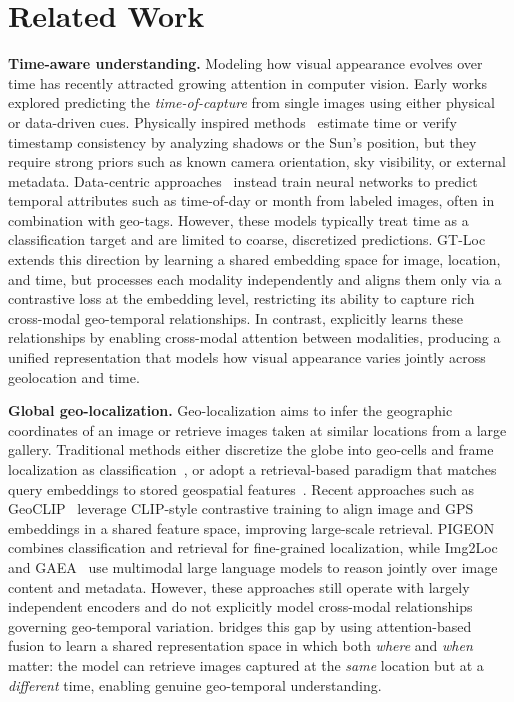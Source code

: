 \section{Related Work}
\label{sec:rel}

\textbf{Time-aware understanding.}
Modeling how visual appearance evolves over time has recently attracted growing attention in computer vision.
Early works explored predicting the \textit{time-of-capture} from single images using either physical or data-driven cues.
Physically inspired methods~\citep{tsai2016photo, li2017you} estimate time or verify timestamp consistency by analyzing shadows or the Sun’s position, but they require strong priors such as known camera orientation, sky visibility, or external metadata.
Data-centric approaches~\citep{zhai2019learning, salem2022timestamp, padilha2022content} instead train neural networks to predict temporal attributes such as time-of-day or month from labeled images, often in combination with geo-tags.
However, these models typically treat time as a classification target and are limited to coarse, discretized predictions.
GT-Loc~\citep{Shatwell_2025_ICCV} extends this direction by learning a shared embedding space for image, location, and time, but processes each modality independently and aligns them only via a contrastive loss at the embedding level, restricting its ability to capture rich cross-modal geo-temporal relationships.
In contrast, \tiger explicitly learns these relationships by enabling cross-modal attention between modalities, producing a unified representation that models how visual appearance varies jointly across geolocation and time.

\textbf{Global geo-localization.}
Geo-localization aims to infer the geographic coordinates of an image or retrieve images taken at similar locations from a large gallery.
Traditional methods either discretize the globe into geo-cells and frame localization as classification~\citep{weyand2016planet, vo2017revisiting, muller2018geolocation, pramanick2022world, kulkarni2024cityguessr}, or adopt a retrieval-based paradigm that matches query embeddings to stored geospatial features~\citep{regmi2019bridging, shi2020looking, zhu2021vigor, zhu2022transgeo, vivanco2024geoclip, Shatwell_2025_ICCV}.
Recent approaches such as GeoCLIP~\citep{vivanco2024geoclip} leverage CLIP-style contrastive training to align image and GPS embeddings in a shared feature space, improving large-scale retrieval.
PIGEON~\citep{Haas_2024_CVPR} combines classification and retrieval for fine-grained localization, while Img2Loc~\citep{zhou2024img2loc} and GAEA~\citep{campos2025gaea} use multimodal large language models to reason jointly over image content and metadata.
However, these approaches still operate with largely independent encoders and do not explicitly model cross-modal relationships governing geo-temporal variation.
\tiger bridges this gap by using attention-based fusion to learn a shared representation space in which both \textit{where} and \textit{when} matter: the model can retrieve images captured at the \textit{same} location but at a \textit{different} time, enabling genuine geo-temporal understanding.

